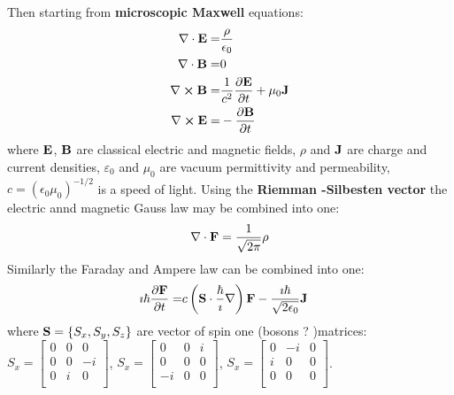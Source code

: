 \documentclass[11pt]{article}
\begin{document}
 Then starting  from {\bf microscopic Maxwell } equations:
\begin{align*}
    \nabla \cdot \vb E  =& \frac{\rho}{\epsilon_0} \\
    \nabla \cdot \vb B  =& 0 \\ 
    \nabla \cross \vb B =& \frac{1}{c^2} \pdv{\vb E}{t} +\mu_0 \vb J \\
    \nabla \cross \vb E = & -\pdv{\vb B}{t}
\end{align*} 
where $\vb E$, $\vb B$ are classical electric and magnetic fields, $\rho$ and $\vb J$  are charge and current densities, $\varepsilon_0$  and $\mu_0$ are vacuum permittivity and permeability, $c = (\epsilon_0 \mu_0)^{-1/2}$ is a speed of light. Using the {\bf Riemman -Silbesten vector }  the electric annd magnetic Gauss law may be combined into one: 
\begin{align}
    \nabla \cdot \vb F = \frac{1}{\sqrt{ 2\pi}} \rho
\end{align}
 Similarly the Faraday and Ampere law can be combined into one:
\begin{align}
   \imath \hbar  \pdv{ \vb F}{t}  
   = &  c \left(\vb S \cdot \frac{\hbar}{\imath} \nabla  \right)  \vb F - \frac{\imath \hbar}{\sqrt{ 2\epsilon_0}} \vb J
\end{align}
 where $\vb S=\{S_x, S_y, S_z \}$ are vector of spin one (bosons ? )matrices: \newline
 $S_x = \begin{bmatrix}
0&0&0\\
0&0&-i\\
0&i&0\\
\end{bmatrix} $, 
 $S_x = \begin{bmatrix}
0&0&i\\
0&0&0\\
-i&0&0\\
\end{bmatrix} $,
 $S_x = \begin{bmatrix}
0&-i&0\\
i&0&0\\
0&0&0\\
\end{bmatrix} $.


%


\newpage


%
\end{document}
